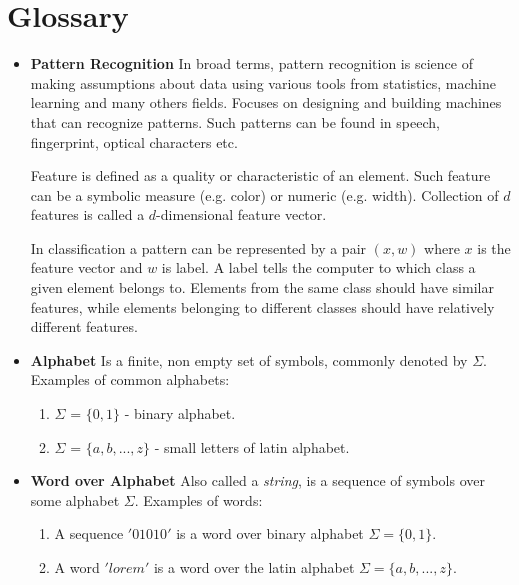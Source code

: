 \documentclass{article}
\begin{document}



\newpage
\section{Glossary}



\begin{itemize}

\item  {\bf Pattern Recognition}
In broad terms, pattern recognition is science of making assumptions about data using various tools from statistics, machine learning and many others fields.
Focuses on designing and building machines that can recognize patterns. Such patterns can be found in speech, fingerprint, optical characters etc.

Feature is defined as a quality or characteristic of an element.
Such feature can be a symbolic measure (e.g. color) or numeric (e.g. width).
Collection of $d$ features is called a $d$-dimensional feature vector.

In classification a pattern can be represented by a pair $(x,w)$ where $x$ is the feature vector and $w$ is label. A label tells the computer to which class a given element belongs to. Elements from the same class should have similar features, while elements belonging to different classes should have relatively different features.


\item {\bf Alphabet}
Is a finite, non empty set of symbols, commonly denoted by $\Sigma$.
Examples of common alphabets:
\begin{enumerate}
	\item $\Sigma$ = $\{0 ,1 \}$ - binary alphabet.
	\item $\Sigma$ = $\{a, b, ..., z\}$ - small letters of latin alphabet.
\end{enumerate}


\item {\bf Word over Alphabet}
Also called a \textit{string}, is a sequence of symbols over some alphabet $\Sigma$.
Examples of words:
\begin{enumerate}
	\item A sequence $'01010'$ is a word over binary alphabet $\Sigma=\{0,1\}$.
	\item A word $'lorem'$ is a word over the latin alphabet $\Sigma=\{a, b, ..., z\}$.
\end{enumerate}


\end{itemize}
\end{document}
